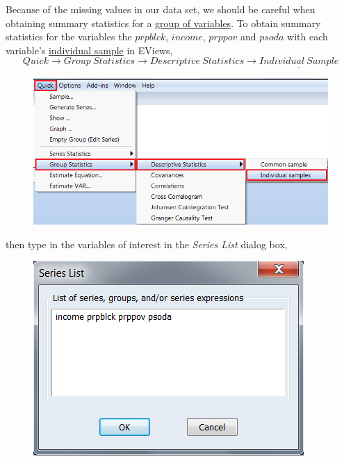 \documentclass[12pt]{report}
\begin{document}
\noindent Because of the missing values in our data set, we should be careful when obtaining summary statistics for a \uline{group of variables}. To obtain summary statistics for the variables the $prpblck$, $income$, $prppov$ and $psoda$ with each variable's \uline{individual sample} in EViews,
$$Quick \to Group\ Statistics \to Descriptive\ Statistics \to \underline{Individual\ Sample}$$
\begin{figure}[H]
	\centerline{\includegraphics{tute5_9}}
\end{figure}
\vspace{-\baselineskip}
\noindent then type in the variables of interest in the \textit{Series List} dialog box,
\begin{figure}[H]
	\centerline{\includegraphics{tute5_10}}
\end{figure}
\vspace{-\baselineskip}
\end{document}
